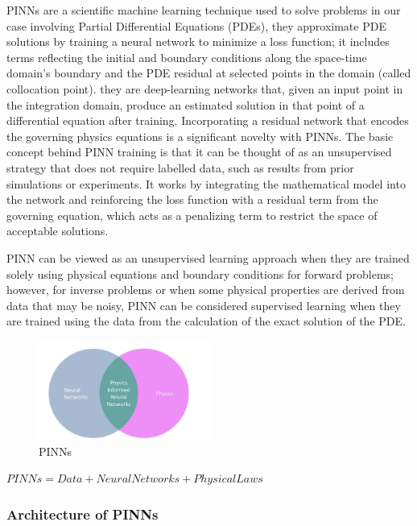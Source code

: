\documentclass{article}
\begin{document}
PINNs are a scientific machine learning technique used to solve problems in our case involving Partial Differential Equations (PDEs), they approximate PDE solutions by training a neural network to minimize a loss function; it includes terms reflecting the initial and boundary conditions along the space-time domain’s boundary and the PDE residual at selected points in the domain (called collocation point). 
they are deep-learning networks that, given an input point in the integration domain, produce an estimated solution in that point of a differential equation after training. Incorporating a residual network that encodes the governing physics equations is a significant novelty with PINNs. 
The basic concept behind PINN training is that it can be thought of as an unsupervised strategy that does not require labelled data, such as results from prior simulations or experiments.
It works by integrating the mathematical model into the network and reinforcing the loss function with a residual term from the governing equation, which acts as a penalizing term to restrict the space of acceptable solutions.

PINN can be viewed as an unsupervised learning approach when they are trained solely using physical equations and boundary conditions for forward problems; however, for inverse problems or when some physical properties are derived from data that may be noisy, PINN can be considered supervised learning when they are trained using the data from the calculation of the exact solution of the PDE.
\begin{figure}[H]
    \centering
    \includegraphics[width=0.5\textwidth]{images/pinns}
    \caption{PINNs}
\end{figure}

$PINNs​ = ​Data​ + ​Neural​Networks​ + ​Physical​Laws$

\subsubsection{Architecture of PINNs}
\end{document}
